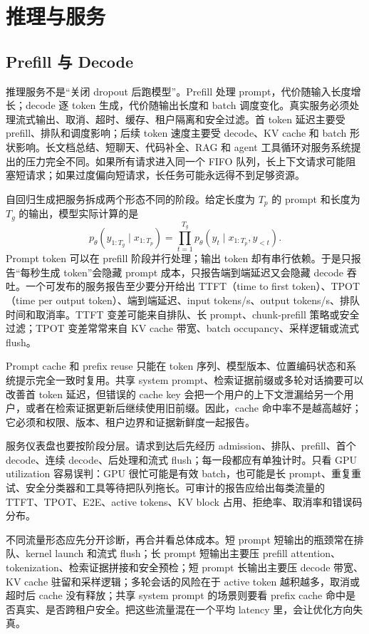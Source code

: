 \documentclass[UTF8,zihao=-4,openany]{ctexbook}
\begin{document}
\chapter{推理与服务}
\section{Prefill 与 Decode}
推理服务不是“关闭 dropout 后跑模型”。Prefill 处理 prompt，代价随输入长度增长；decode 逐 token 生成，代价随输出长度和 batch 调度变化。真实服务必须处理流式输出、取消、超时、缓存、租户隔离和安全过滤。首 token 延迟主要受 prefill、排队和调度影响；后续 token 速度主要受 decode、KV cache 和 batch 形状影响。长文档总结、短聊天、代码补全、RAG 和 agent 工具循环对服务系统提出的压力完全不同。如果所有请求进入同一个 FIFO 队列，长上下文请求可能阻塞短请求；如果过度偏向短请求，长任务可能永远得不到足够资源。

自回归生成把服务拆成两个形态不同的阶段。给定长度为 $T_p$ 的 prompt 和长度为 $T_g$ 的输出，模型实际计算的是
\[
  p_\theta(y_{1:T_g}\mid x_{1:T_p})
  =\prod_{t=1}^{T_g}p_\theta(y_t\mid x_{1:T_p},y_{<t}).
\]
Prompt token 可以在 prefill 阶段并行处理；输出 token 却有串行依赖。于是只报告“每秒生成 token”会隐藏 prompt 成本，只报告端到端延迟又会隐藏 decode 吞吐。一个可发布的服务报告至少要分开给出 TTFT（time to first token）、TPOT（time per output token）、端到端延迟、input tokens/s、output tokens/s、排队时间和取消率。TTFT 变差可能来自排队、长 prompt、chunk-prefill 策略或安全过滤；TPOT 变差常常来自 KV cache 带宽、batch occupancy、采样逻辑或流式 flush。

Prompt cache 和 prefix reuse 只能在 token 序列、模型版本、位置编码状态和系统提示完全一致时复用。共享 system prompt、检索证据前缀或多轮对话摘要可以改善首 token 延迟，但错误的 cache key 会把一个用户的上下文泄漏给另一个用户，或者在检索证据更新后继续使用旧前缀。因此，cache 命中率不是越高越好；它必须和权限、版本、租户边界和证据新鲜度一起报告。

服务仪表盘也要按阶段分层。请求到达后先经历 admission、排队、prefill、首个 decode、连续 decode、后处理和流式 flush；每一段都应有单独计时。只看 GPU utilization 容易误判：GPU 很忙可能是有效 batch，也可能是长 prompt、重复重试、安全分类器和工具等待把队列拖长。可审计的报告应给出每类流量的 TTFT、TPOT、E2E、active tokens、KV block 占用、拒绝率、取消率和错误码分布。

不同流量形态应先分开诊断，再合并看总体成本。短 prompt 短输出的瓶颈常在排队、kernel launch 和流式 flush；长 prompt 短输出主要压 prefill attention、tokenization、检索证据拼接和安全预检；短 prompt 长输出主要压 decode 带宽、KV cache 驻留和采样逻辑；多轮会话的风险在于 active token 越积越多，取消或超时后 cache 没有释放；共享 system prompt 的场景则要看 prefix cache 命中是否真实、是否跨租户安全。把这些流量混在一个平均 latency 里，会让优化方向失真。
\end{document}
